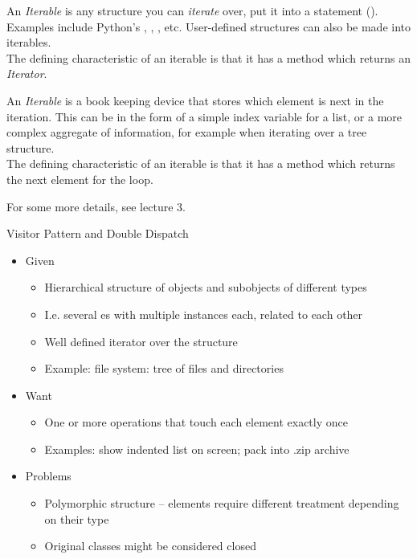 \begin{frame}
%
\begin{recapbox}
An \emph{Iterable} is any structure you can \emph{iterate} over, \ie put it into a  statement (). Examples include Python's , , , etc. User-defined structures can also be made into iterables.\\
The defining characteristic of an iterable is that it has a  method which returns an \emph{Iterator}.

\vspace{3pt}
An \emph{Iterable} is a book keeping device that stores which element is next in the iteration. This can be in the form of a simple index variable for a list, or a more complex aggregate of information, for example when iterating over a tree structure.\\
The defining characteristic of an iterable is that it has a  method which returns the next element for the  loop.

\vspace{3pt}
For some more details, see lecture 3.
\end{recapbox}
%
\end{frame}


\begin{frame}{Visitor Pattern and Double Dispatch}
%
\begin{itemize}
\item Given
	\begin{itemize}
	\item Hierarchical structure of objects and subobjects of different types
	\item I.\;e. several es with multiple instances each, related to each other
	\item Well defined iterator over the structure
	\item Example: file system: tree of files and directories
	\end{itemize}
\item Want
	\begin{itemize}
	\item One or more operations that touch each element exactly once
	\item Examples: show indented list on screen; pack into .zip archive
	\end{itemize}
\item Problems
	\begin{itemize}
	\item Polymorphic structure -- elements require different treatment depending on their type
	\item Original classes might be considered closed
	\end{itemize}
\end{itemize}
%
\end{frame}


